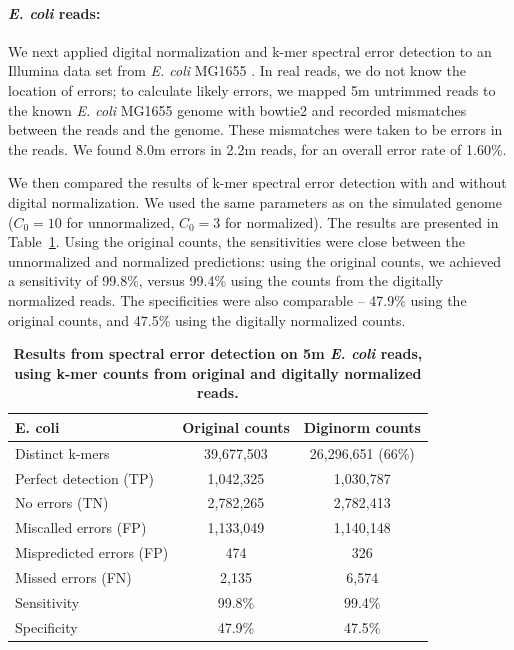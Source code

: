 \documentclass{article}
\begin{document}

\paragraph{{\em E. coli} reads:}
We next applied digital normalization and k-mer spectral error
detection to an Illumina data set from {\em E. coli} MG1655
\cite{pubmed21926975}.  In real reads, we do not know the location of
errors; to calculate likely errors, we mapped 5m untrimmed reads to
the known {\em E. coli} MG1655 genome with bowtie2 \cite{bowtie2} and
recorded mismatches between the reads and the genome.  These
mismatches were taken to be errors in the reads.  We found 8.0m errors
in 2.2m reads, for an overall error rate of 1.60\%.

We then compared the results of k-mer spectral error detection with
and without digital normalization.  We used the same parameters as on
the simulated genome ($C_0=10$ for unnormalized, $C_0=3$ for
normalized).  The results are presented in
Table~\ref{tab:ecoli_dn_counts}. Using the original counts, the
sensitivities were close between the unnormalized and normalized
predictions: using the original counts, we achieved a sensitivity of
99.8\%, versus 99.4\% using the counts from the digitally normalized
reads.  The specificities were also comparable -- 47.9\% using the original
counts, and 47.5\% using the digitally normalized counts.



\begin{table}
\begin{tabular}{|l|c|c|}
\hline
{\bf E. coli} & Original counts & Diginorm counts \\
\hline
Distinct k-mers         & 39,677,503 & 26,296,651 (66\%) \\
\hline
Perfect detection (TP)  & 1,042,325 & 1,030,787 \\
No errors (TN)          & 2,782,265 & 2,782,413 \\
Miscalled errors (FP)   & 1,133,049 & 1,140,148 \\
Mispredicted errors (FP)& 474       & 326       \\
Missed errors (FN)      & 2,135     & 6,574     \\
\hline
Sensitivity & 99.8\% & 99.4\% \\
Specificity & 47.9\% & 47.5\% \\
\hline
\end{tabular}

\caption{{\bf Results from spectral error detection on 5m {\em
      E. coli} reads, using k-mer counts from original and digitally
    normalized reads.}}

\label{tab:ecoli_dn_counts}
\end{table}
\end{document}
